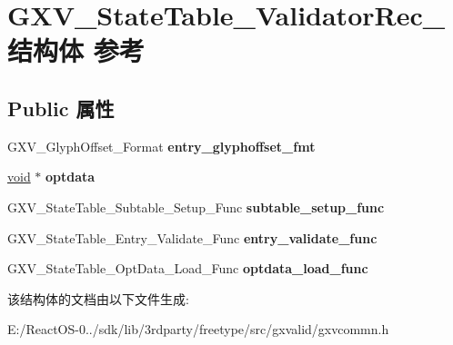 \hypertarget{struct_g_x_v___state_table___validator_rec__}{}\section{G\+X\+V\+\_\+\+State\+Table\+\_\+\+Validator\+Rec\+\_\+结构体 参考}
\label{struct_g_x_v___state_table___validator_rec__}
\subsection*{Public 属性}
\begin{DoxyCompactItemize}
\item 
\mbox{\label{struct_g_x_v___state_table___validator_rec___aaf4878ac492449e9aaa827ccffa6828d}} 
G\+X\+V\+\_\+\+Glyph\+Offset\+\_\+\+Format {\bfseries entry\+\_\+glyphoffset\+\_\+fmt}
\item 
\mbox{\label{struct_g_x_v___state_table___validator_rec___a44a24a5f3279d8608d3cf046cf48ee13}} 
\hyperlink{interfacevoid}{void} $\ast$ {\bfseries optdata}
\item 
\mbox{\label{struct_g_x_v___state_table___validator_rec___a4180efbe2cdb8158b1ec4a508a35905a}} 
G\+X\+V\+\_\+\+State\+Table\+\_\+\+Subtable\+\_\+\+Setup\+\_\+\+Func {\bfseries subtable\+\_\+setup\+\_\+func}
\item 
\mbox{\label{struct_g_x_v___state_table___validator_rec___a264644e0c4e9eb9ca952eda226def49b}} 
G\+X\+V\+\_\+\+State\+Table\+\_\+\+Entry\+\_\+\+Validate\+\_\+\+Func {\bfseries entry\+\_\+validate\+\_\+func}
\item 
\mbox{\label{struct_g_x_v___state_table___validator_rec___ac1faad3470643bd7753b6d41bcf43cb4}} 
G\+X\+V\+\_\+\+State\+Table\+\_\+\+Opt\+Data\+\_\+\+Load\+\_\+\+Func {\bfseries optdata\+\_\+load\+\_\+func}
\end{DoxyCompactItemize}


该结构体的文档由以下文件生成\+:\begin{DoxyCompactItemize}
\item 
E\+:/\+React\+O\+S-\/0../sdk/lib/3rdparty/freetype/src/gxvalid/gxvcommn.\+h\end{DoxyCompactItemize}
